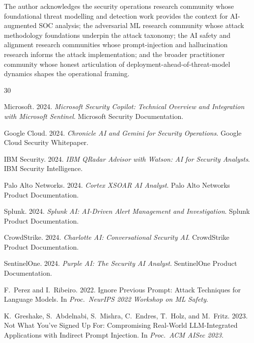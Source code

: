 \documentclass[sigconf,nonacm]{acmart}
\begin{document}
\begin{acks}
The author acknowledges the security operations research
community whose foundational threat modelling and detection
work provides the context for AI-augmented SOC analysis; the
adversarial ML research community whose attack methodology
foundations underpin the attack taxonomy; the AI safety and
alignment research communities whose prompt-injection and
hallucination research informs the attack implementation; and
the broader practitioner community whose honest articulation
of deployment-ahead-of-threat-model dynamics shapes the
operational framing.
\end{acks}

\sloppy

\begin{thebibliography}{30}

Microsoft. 2024. \textit{Microsoft Security Copilot: Technical
Overview and Integration with Microsoft Sentinel}. Microsoft
Security Documentation.

Google Cloud. 2024. \textit{Chronicle AI and Gemini for Security
Operations}. Google Cloud Security Whitepaper.

IBM Security. 2024. \textit{IBM QRadar Advisor with Watson: AI
for Security Analysts}. IBM Security Intelligence.

Palo Alto Networks. 2024. \textit{Cortex XSOAR AI Analyst}.
Palo Alto Networks Product Documentation.

Splunk. 2024. \textit{Splunk AI: AI-Driven Alert Management and
Investigation}. Splunk Product Documentation.

CrowdStrike. 2024. \textit{Charlotte AI: Conversational Security
AI}. CrowdStrike Product Documentation.

SentinelOne. 2024. \textit{Purple AI: The Security AI Analyst}.
SentinelOne Product Documentation.

F.~Perez and I.~Ribeiro. 2022. Ignore Previous Prompt: Attack
Techniques for Language Models. In \textit{Proc.\ NeurIPS 2022
Workshop on ML Safety}.

K.~Greshake, S.~Abdelnabi, S.~Mishra, C.~Endres, T.~Holz, and
M.~Fritz. 2023. Not What You've Signed Up For: Compromising
Real-World LLM-Integrated Applications with Indirect Prompt
Injection. In \textit{Proc.\ ACM AISec 2023}.


\end{thebibliography}
\end{document}
